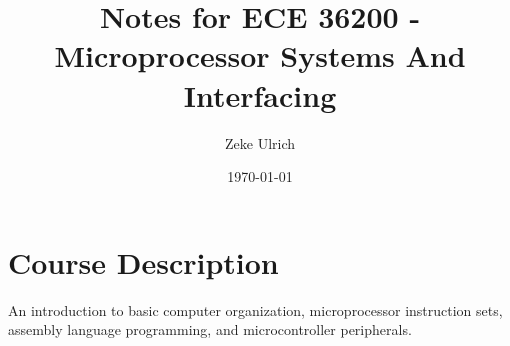 \documentclass[nobib]{tufte-handout}
\title{Notes for ECE 36200 - Microprocessor Systems And Interfacing}
\author{Zeke Ulrich}
\date{\today}
\begin{document}
\maketitle

\tableofcontents

\section{Course Description}
An introduction to basic computer organization, microprocessor instruction sets, assembly language programming, and microcontroller peripherals.
\pagebreak







\end{document}
